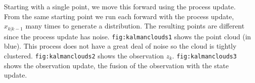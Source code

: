 Starting with a single point, we move this forward using the process
update. From the same starting point we run each forward with the
process update, \(\hat{x}_{k|k-1}\) many times to generate a
distribution. The resulting points are different since the process
update has noise. \texttt{fig:kalmanclouds1} shows the point cloud (in
blue). This process does not have a great deal of noise so the cloud is
tightly clustered. \texttt{fig:kalmanclouds2} shows the observation
\(z_k\). \texttt{fig:kalmanclouds3} shows the observation update, the
fusion of the observation with the state update.

\begin{Shaded}
\begin{Highlighting}[]
\OperatorTok{,} \OperatorTok{,}
\OperatorTok{=} 
\OperatorTok{=}\NormalTok{ [} \OperatorTok{{-}} \OperatorTok{;}  \NormalTok{]}
\OperatorTok{=}
\OperatorTok{=}\NormalTok{ [} \OperatorTok{;} \NormalTok{]}
\OperatorTok{=}\NormalTok{ [}\OperatorTok{,}\NormalTok{]}
\OperatorTok{=}\NormalTok{ [} \OperatorTok{;} \NormalTok{]}
\OperatorTok{=}\NormalTok{ [}  \OperatorTok{;}  \NormalTok{]}
\OperatorTok{,}\OperatorTok{=} \OperatorTok{,} 
\OperatorTok{,}\OperatorTok{=} \OperatorTok{,} 
\OperatorTok{=}\OperatorTok{*}
\OperatorTok{=}\OperatorTok{*}
\OperatorTok{=}\OperatorTok{,}
\OperatorTok{=}\OperatorTok{,}
\OperatorTok{=}\NormalTok{ [var1 } \OperatorTok{;} \NormalTok{ var1]}
\OperatorTok{=}\NormalTok{ [var2 } \OperatorTok{;} \NormalTok{ var2]}
\OperatorTok{=} \NormalTok{\{}\NormalTok{\}()}
\OperatorTok{=} \NormalTok{\{}\NormalTok{\}()}
\OperatorTok{=} \NormalTok{\{}\NormalTok{\}()}
\OperatorTok{=} \NormalTok{\{}\NormalTok{\}()}
\OperatorTok{=} \NormalTok{\{}\NormalTok{\}()}
\OperatorTok{=} \NormalTok{\{}\NormalTok{\}()}



\end{Highlighting}
\end{Shaded}
